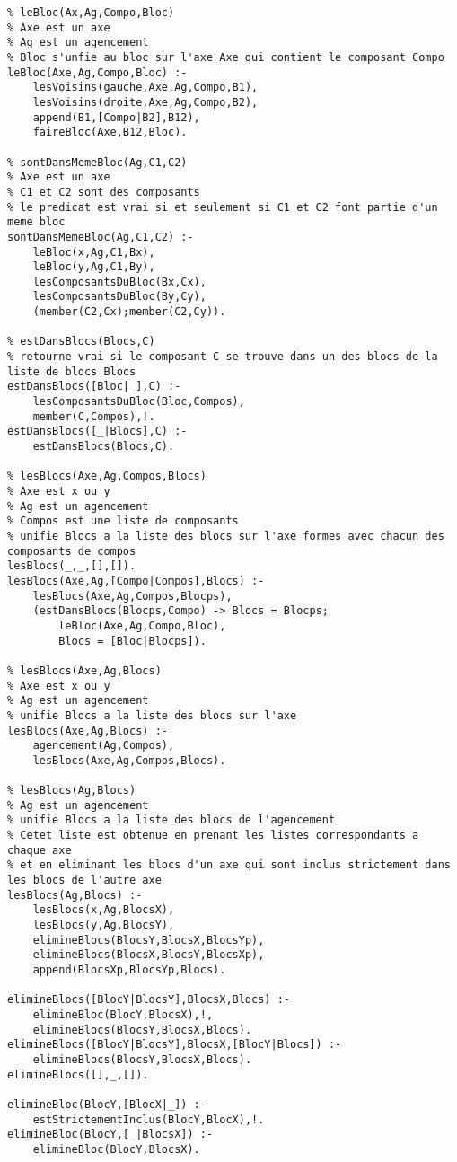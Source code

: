 \documentclass[letterpaper,11pt]{letter}
\begin{document}
\begin{Verbatim}
% leBloc(Ax,Ag,Compo,Bloc)
% Axe est un axe
% Ag est un agencement
% Bloc s'unfie au bloc sur l'axe Axe qui contient le composant Compo
leBloc(Axe,Ag,Compo,Bloc) :-
	lesVoisins(gauche,Axe,Ag,Compo,B1),
	lesVoisins(droite,Axe,Ag,Compo,B2),
	append(B1,[Compo|B2],B12),
	faireBloc(Axe,B12,Bloc).

% sontDansMemeBloc(Ag,C1,C2)
% Axe est un axe
% C1 et C2 sont des composants
% le predicat est vrai si et seulement si C1 et C2 font partie d'un meme bloc
sontDansMemeBloc(Ag,C1,C2) :-
	leBloc(x,Ag,C1,Bx),
	leBloc(y,Ag,C1,By),
	lesComposantsDuBloc(Bx,Cx),
	lesComposantsDuBloc(By,Cy),
	(member(C2,Cx);member(C2,Cy)).

% estDansBlocs(Blocs,C) 
% retourne vrai si le composant C se trouve dans un des blocs de la liste de blocs Blocs
estDansBlocs([Bloc|_],C) :-
	lesComposantsDuBloc(Bloc,Compos),
	member(C,Compos),!.
estDansBlocs([_|Blocs],C) :-
	estDansBlocs(Blocs,C).

% lesBlocs(Axe,Ag,Compos,Blocs)
% Axe est x ou y
% Ag est un agencement
% Compos est une liste de composants
% unifie Blocs a la liste des blocs sur l'axe formes avec chacun des composants de compos
lesBlocs(_,_,[],[]).
lesBlocs(Axe,Ag,[Compo|Compos],Blocs) :-
	lesBlocs(Axe,Ag,Compos,Blocps),
	(estDansBlocs(Blocps,Compo) -> Blocs = Blocps;
	    leBloc(Axe,Ag,Compo,Bloc),
	    Blocs = [Bloc|Blocps]).

% lesBlocs(Axe,Ag,Blocs)
% Axe est x ou y
% Ag est un agencement
% unifie Blocs a la liste des blocs sur l'axe
lesBlocs(Axe,Ag,Blocs) :-
	agencement(Ag,Compos),
	lesBlocs(Axe,Ag,Compos,Blocs).

% lesBlocs(Ag,Blocs)
% Ag est un agencement
% unifie Blocs a la liste des blocs de l'agencement
% Cetet liste est obtenue en prenant les listes correspondants a chaque axe
% et en eliminant les blocs d'un axe qui sont inclus strictement dans les blocs de l'autre axe
lesBlocs(Ag,Blocs) :-
	lesBlocs(x,Ag,BlocsX),
	lesBlocs(y,Ag,BlocsY),
	elimineBlocs(BlocsY,BlocsX,BlocsYp),
	elimineBlocs(BlocsX,BlocsY,BlocsXp),
	append(BlocsXp,BlocsYp,Blocs).

elimineBlocs([BlocY|BlocsY],BlocsX,Blocs) :-
	elimineBloc(BlocY,BlocsX),!,
	elimineBlocs(BlocsY,BlocsX,Blocs).
elimineBlocs([BlocY|BlocsY],BlocsX,[BlocY|Blocs]) :-
	elimineBlocs(BlocsY,BlocsX,Blocs).
elimineBlocs([],_,[]).

elimineBloc(BlocY,[BlocX|_]) :-
	estStrictementInclus(BlocY,BlocX),!.
elimineBloc(BlocY,[_|BlocsX]) :-
	elimineBloc(BlocY,BlocsX).
\end{Verbatim}
\end{document}
